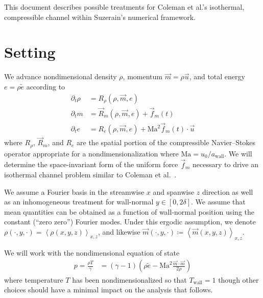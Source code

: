 \documentclass[letterpaper,11pt,nointlimits,reqno]{amsart}
\begin{document}
This document describes possible treatments for Coleman et al.'s isothermal,
compressible channel within Suzerain's numerical framework.

\section{Setting}

We advance nondimensional density $\rho$, momentum $\vec{m}=\rho{}\vec{u}$, and
total energy $e = \rho{}\tilde{e}$ according to
\begin{subequations}
\begin{align}
  \partial_{t} \rho{} &= R_{\rho}\!\left(\rho,\vec{m},e\right)
  \\
  \partial_{t} m      &= \vec{R}_{m}\!\left(\rho,\vec{m},e\right)
                       + \vec{f}_{m}(t)
  \\
  \partial_{t} e      &= R_{e}\!\left(\rho,\vec{m},e\right)
                       + \mbox{Ma}^{2} \vec{f}_{m}(t) \cdot \vec{u}
\end{align}
\end{subequations}
where $R_{\rho}$, $\vec{R}_{m}$, and $R_{e}$ are the spatial portion of the
compressible Navier--Stokes operator appropriate for a nondimensionalization
where $\mbox{Ma}=u_{0}/a_\text{wall}$.  We will determine the space-invariant
form of the uniform force $\vec{f}_{m}$ necessary to drive an isothermal
channel problem similar to Coleman et al.~\cite{Coleman1995Numerical}.

We assume a Fourier basis in the streamwise $x$ and spanwise $z$ direction as
well as an inhomogeneous treatment for wall-normal
$y\in\left[0,2\delta\right]$.  We assume that mean quantities can be obtained
as a function of wall-normal position using the constant (``zero zero'')
Fourier modes.  Under this ergodic assumption, we denote
$\rho\!\left(\cdot,y,\cdot\right) = \left<\rho\left(x,y,z\right)\right>_{x,z}$,
and likewise $\vec{m}\!\left(\cdot,y,\cdot\right) \coloneqq
\left<\vec{m}\left(x,y,z\right)\right>_{x,z}$.

We will work with the
nondimensional equation of state
\begin{align}
  p  = \frac{\rho{}T}{\gamma}
    &= \left(\gamma-1\right) \left(
          \rho\tilde{e} - \mbox{Ma}^2\frac{\vec{m}\cdot\vec{m}}{2\rho}
        \right)
\end{align}
where temperature $T$ has been nondimensionalized so that $T_\text{wall}=1$
though other choices should have a minimal impact on the analysis that follows.
\end{document}
